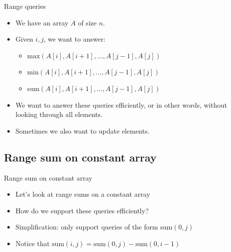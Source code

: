 \documentclass{beamer}
\begin{document}
\begin{frame}[plain]{Range queries}
    \vspace{30pt}
    \begin{itemize}
        \item<1-> We have an array $A$ of size $n$.
        \item<2-> Given $i,j$, we want to answer:
            \begin{itemize}
                \item<3-> $\mathrm{max}(A[i],A[i+1],\ldots,A[j-1],A[j])$
                \item<4-> $\mathrm{min}(A[i],A[i+1],\ldots,A[j-1],A[j])$
                \item<5-> $\mathrm{sum}(A[i],A[i+1],\ldots,A[j-1],A[j])$
            \end{itemize}
        \item<6-> We want to answer these queries efficiently, or in other words, without looking through all elements.
        \item<7-> Sometimes we also want to update elements.
    \end{itemize}
\end{frame}

\subsection*{Range sum on constant array}

\begin{frame}[plain]{Range sum on constant array}
    \begin{itemize}
        \item<1-> Let's look at range sums on a constant array
        \item<2-> How do we support these queries efficiently?
    \end{itemize}

     {
    \begin{itemize}
        \item<3-> Simplification: only support queries of the form $\mathrm{sum}(0, j)$
        \item<4-> Notice that $\mathrm{sum}(i,j) = \mathrm{sum}(0,j) - \mathrm{sum}(0,i-1)$
    \end{itemize} }
\end{frame}
\end{document}
